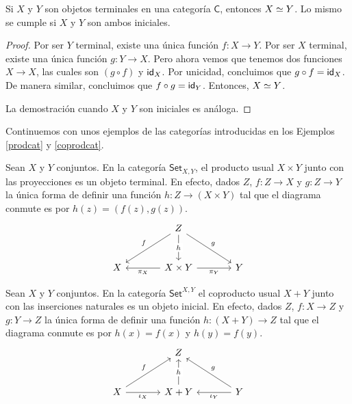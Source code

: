 \documentclass[../main.tex]{subfiles}
\begin{document}
\begin{theorem}
    Si $X$ y $Y$ son objetos terminales en una categor\'ia $\mathsf{C}$, entonces $\eqv{X}{Y}$. Lo mismo se cumple si $X$ y $Y$ son ambos iniciales.
\end{theorem}
\begin{proof}
    Por ser $Y$ terminal, existe una \'unica funci\'on $f: X \to Y$. Por ser $X$ terminal, existe una \'unica funci\'on $g: Y \to X$. Pero ahora vemos que tenemos dos funciones $X \to X$, las cuales son $(g\circ f)$ y $\idfunc[X]$. Por unicidad, concluimos que $g\circ f = \idfunc[X]$. De manera similar, concluimos que $f \circ g = \idfunc[Y]$. Entonces, $\eqv{X}{Y}$.

    La demostraci\'on cuando $X$ y $Y$ son iniciales es an\'aloga.
\end{proof}

Continuemos con unos ejemplos de las categor\'ias introducidas en los Ejemplos \ref{prodcat} y \ref{coprodcat}.

\begin{exampleap}
    Sean $X$ y $Y$ conjuntos. En la categor\'ia $\mathsf{Set}_{X,Y}$, el producto usual $X \times Y$ junto con las proyecciones es un objeto terminal.
    En efecto, dados $Z$, $f:Z \to X$ y $g:Z\to Y$ la \'unica forma de definir una funci\'on $h:Z \to (X \times Y)$ tal que el diagrama conmute es por $h(z)=(f(z),g(z))$.
    \[\begin{tikzcd}[row sep=large,column sep=large]
            & Z \\
            X & {X \times Y} & Y
            \arrow["f"', from=1-2, to=2-1]
            \arrow["{\pi_X}", from=2-2, to=2-1]
            \arrow["g", from=1-2, to=2-3]
            \arrow["{\pi_Y}"', from=2-2, to=2-3]
            \arrow["h"{description}, from=1-2, to=2-2]
        \end{tikzcd}\]
\end{exampleap}

\begin{exampleap}
    Sean $X$ y $Y$ conjuntos. En la categor\'ia $\mathsf{Set}^{X,Y}$ el coproducto usual $X + Y$ junto con las inserciones naturales es un objeto inicial.
    En efecto, dados $Z$, $f:X \to Z$ y $g:Y\to Z$ la \'unica forma de definir una funci\'on $h: (X + Y) \to Z$ tal que el diagrama conmute es por $h(x)=f(x)$ y $h(y)=f(y)$.
    \[\begin{tikzcd}[row sep=large,column sep=large]
            & Z \\
            X & {X+Y} & Y
            \arrow["f", from=2-1, to=1-2]
            \arrow["{\iota_X}"', from=2-1, to=2-2]
            \arrow["g"', from=2-3, to=1-2]
            \arrow["\iota_Y", from=2-3, to=2-2]
            \arrow["h"{description}, from=2-2, to=1-2]
        \end{tikzcd}\]
\end{exampleap}
\end{document}
